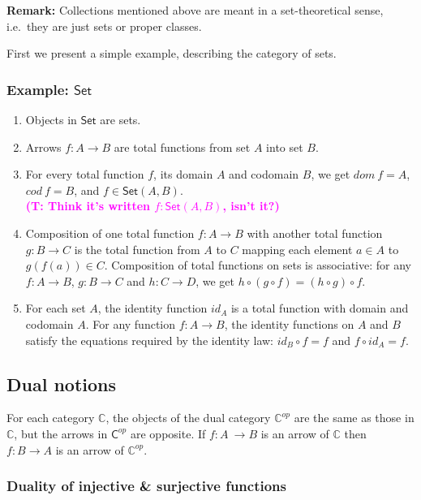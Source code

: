 \documentclass{amsart}
\theoremstyle{definition}
\newcommand{\truls}[1]{\textbf{\textcolor{magenta}{(T: #1)}}}
\newcommand{\cat}[1]{\mathsf{#1}} %
\newcommand{\acat}[1]{\mathbb{#1}} %
\begin{document}
\textbf{Remark:} Collections mentioned above are meant in a
set-theoretical sense, i.e.~they are just sets or proper classes.

First we present a simple example, describing the category of sets.

\subsubsection{Example: $\cat{Set}$}

\begin{enumerate}
\item Objects in $\cat{Set}$ are sets.
\item Arrows $f: A\to B$ are total functions from set $A$ into set $B$.
\item For every total function $f$, its domain $A$ and codomain $B$, we get
  $dom\ f = A$, $cod\ f = B$, and $f \in \cat{Set}(A, B)$. \\\truls{Think it's written $f : \cat{Set}(A,B)$, isn't it?}
\item Composition of one total function $f: A\to B$ with another total
  function $g: B\to C$ is the total function from $A$ to $C$ mapping
  each element $a \in A$ to $g(f(a))\in C$. Composition of total
  functions on sets is associative: for any $f: A\to B$, $g: B\to C$ and
  $h:C \to D$, we get $h\circ (g\circ f) = (h\circ g)\circ f$.
\item For each set $A$, the identity function $id_A$ is a total function
  with domain and codomain $A$. For any function $f: A\to B$, the
  identity functions on $A$ and $B$ satisfy the equations required by
  the identity law: $id_B \circ f = f$ and $f \circ id_A = f$.
\end{enumerate}

\subsection{Dual notions}

For each category $\acat{C}$, the objects of the dual category $\acat{C}^{op}$ are the same as those in $\acat{C}$, but the arrows in $\cat{C}^{op}$ are opposite. If $f: A~\to B$ is an arrow of $\acat{C}$ then $f: B \to A$ is an arrow of $\acat{C}^{op}$. 

\subsubsection{Duality of injective \& surjective functions}
\end{document}
